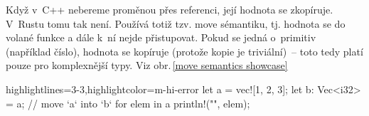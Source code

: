 \documentclass[main.tex]{subfiles}
\begin{document}

Když v~C++ nebereme proměnou přes referenci, její hodnota se zkopíruje. V~Rustu tomu tak
není. Používá totiž tzv. move sémantiku, tj. hodnota se  do volané funkce a
dále k~ní nejde přistupovat. Pokud se jedná o~primitiv (například číslo), hodnota se
kopíruje (protože kopie je triviální)~-- toto tedy platí pouze pro komplexnější typy.
Viz obr.\,\ref{move semantics showcase}
\cite[sekce\,15.2]{byexample}

\obrazek
\begin{rustcode*}{highlightlines={3-3},highlightcolor=m-hi-error}
    let a = vec![1, 2, 3];
    let b: Vec<i32> = a; // move `a` into `b`
    for elem in a {
        println!("{}", elem);
    }
\end{rustcode*}
\newline
{}
\end{document}
